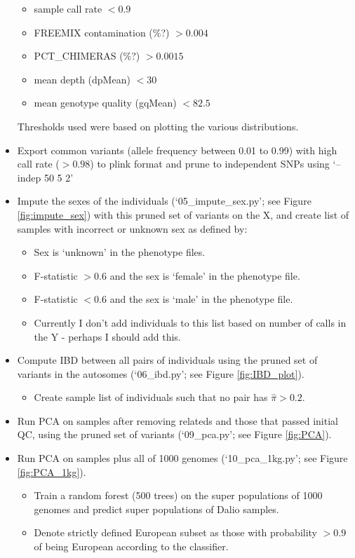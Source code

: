 \documentclass[12pt]{article}
\begin{document}
\begin{itemize}
\begin{itemize}
    	\item sample call rate $< 0.9$
    	\item FREEMIX contamination (\%?) $> 0.004$
    	\item PCT\_CHIMERAS (\%?) $>  0.0015$
    	\item mean depth (dpMean) $< 30$
    	\item mean genotype quality (gqMean) $< 82.5$
    \end{itemize}
    Thresholds used were based on plotting the various distributions.
    \item Export common variants (allele frequency between 0.01 to 0.99) with high call rate ($>0.98$) to plink format and prune to independent SNPs using `--indep 50 5 2'
	\item Impute the sexes of the individuals (`05\_impute\_sex.py'; see Figure \ref{fig:impute_sex}) with this pruned set of variants on the X, and create list of samples with incorrect or unknown sex as defined by:
	\begin{itemize}
		\item Sex is `unknown' in the phenotype files.
		\item F-statistic $> 0.6$ and the sex is `female' in the phenotype file.
		\item F-statistic $< 0.6$ and the sex is `male' in the phenotype file.
		\item Currently I don't add individuals to this list based on number of calls in the Y - perhaps I should add this.
	\end{itemize}
	\item Compute IBD between all pairs of individuals using the pruned set of variants in the autosomes (`06\_ibd.py'; see Figure \ref{fig:IBD_plot}).
		\begin{itemize}
			\item Create sample list of individuals such that no pair has $\hat{\pi}>0.2$.
		\end{itemize}
	\item Run PCA on samples after removing relateds and those that passed initial QC, using the pruned set of variants (`09\_pca.py'; see Figure \ref{fig:PCA}).
	\item Run PCA on samples plus all of 1000 genomes (`10\_pca\_1kg.py'; see Figure \ref{fig:PCA_1kg}).
	\begin{itemize}
		\item Train a random forest (500 trees) on the super populations of 1000 genomes and predict super populations of Dalio samples.
		\item Denote strictly defined European subset as those with probability $> 0.9$ of being European according to the classifier. 

\end{itemize}
\end{itemize}
\end{document}
